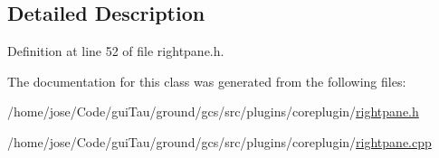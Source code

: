 \subsection{Detailed Description}


Definition at line 52 of file rightpane.\-h.



The documentation for this class was generated from the following files\-:\begin{DoxyCompactItemize}
\item 
/home/jose/\-Code/gui\-Tau/ground/gcs/src/plugins/coreplugin/\hyperlink{rightpane_8h}{rightpane.\-h}\item 
/home/jose/\-Code/gui\-Tau/ground/gcs/src/plugins/coreplugin/\hyperlink{rightpane_8cpp}{rightpane.\-cpp}\end{DoxyCompactItemize}
